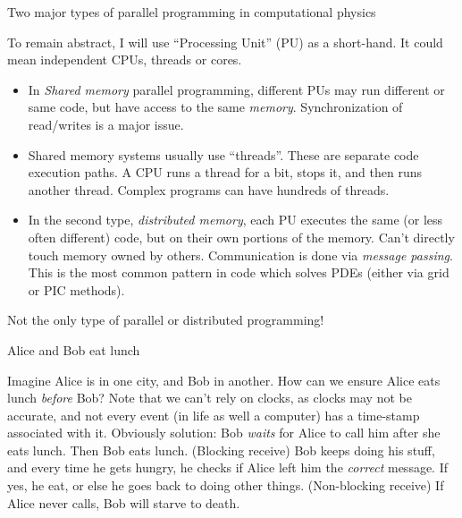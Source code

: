\documentclass[aspectratio=169]{beamer}
\newcommand{\mypause}{\pause}
\begin{document}
\begin{frame}{Two major types of parallel programming in computational
    physics}

  To remain abstract, I will use ``Processing Unit'' (PU) as a
  short-hand. It could mean independent CPUs, threads or cores.
  \begin{itemize}
  \item In \emph{Shared memory} parallel programming, different PUs
    may run different or same code, but have access to the same
    \emph{memory}. Synchronization of read/writes is a major issue.
  \item Shared memory systems usually use ``threads''. These are
    separate code execution paths. A CPU runs a thread for a bit, stops
    it, and then runs another thread. Complex programs can have
    hundreds of threads. %
    \mypause%
  \item In the second type, \emph{distributed memory}, each PU
    executes the same (or less often different) code, but on their own
    portions of the memory. Can't directly touch memory owned by
    others. Communication is done via \emph{message passing}. This is
    the most common pattern in code which solves PDEs (either via grid
    or PIC methods).
  \end{itemize}
  Not the only type of parallel or distributed programming!
\end{frame}

\begin{frame}{Alice and Bob eat lunch}

  {\color{blue} Imagine Alice is in one city, and Bob in another. How
    can we ensure Alice eats lunch \emph{before} Bob?}  \vskip0.1in%
  \mypause%
  Note that we can't rely on clocks, as clocks may not be accurate,
  and not every event (in life as well a computer) has a time-stamp
  associated with it.%
  \vskip0.1in%
  \mypause%
  Obviously solution: Bob \emph{waits} for Alice to call him after she
  eats lunch. Then Bob eats lunch. (Blocking receive)%
  \vskip0.1in%
  \mypause%
  Bob keeps doing his stuff, and every time he gets hungry, he checks
  if Alice left him the \emph{correct} message. If yes, he eat, or
  else he goes back to doing other things. (Non-blocking receive)%
  \vskip0.1in%
  \mypause%
  If Alice never calls, Bob will starve to death.
\end{frame}
\end{document}
